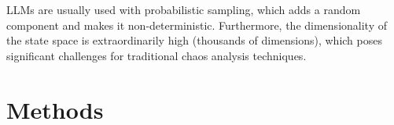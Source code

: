 \documentclass[a4paper,12pt]{article}
\begin{document}
LLMs are usually used with probabilistic sampling, which adds a random component and makes it non-deterministic. Furthermore, the dimensionality of the state space is extraordinarily high (thousands of dimensions), which poses significant challenges for traditional chaos analysis techniques.




\section{Methods}
\label{sec:methods}
\end{document}
